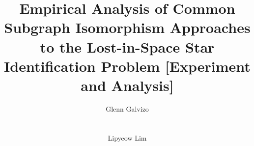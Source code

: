 \documentclass{include/vldb}
\begin{document}
	\title{Empirical Analysis of Common Subgraph Isomorphism Approaches to the Lost-in-Space Star
    Identification Problem [Experiment and Analysis]}

	\author{
		\alignauthor Glenn Galvizo  \\
			 \\
			 \\
		\alignauthor Lipyeow Lim \\
			 \\
			 \\
	}

	\maketitle

	
	
	
	
	
	
	
    

    \newpage
	\nocite{*}
	
	
    \balance
\end{document}
